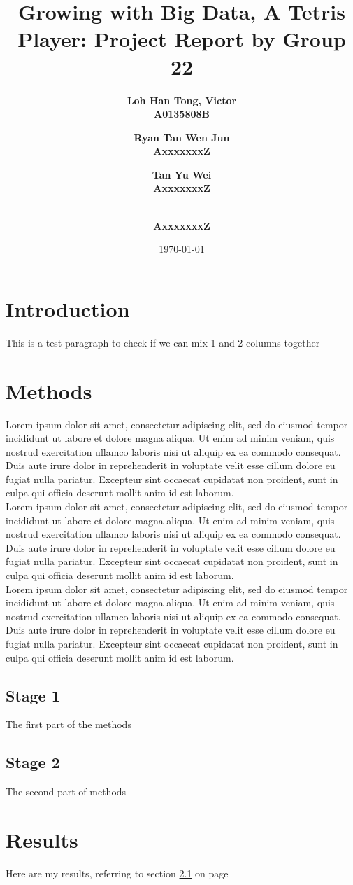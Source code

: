 \documentclass[a4paper,12pt,twocolumn]{article}
\begin{document}
\title{Growing with Big Data, A Tetris Player: Project Report by Group 22}
\author{\bf{Loh Han Tong, Victor} \\ A0135808B
    \and \bf{Ryan Tan Wen Jun} \\ AxxxxxxxZ \and \bf {Tan Yu Wei} \\ AxxxxxxxZ
    \and \bf{} \\ AxxxxxxxZ
}
\date{\today}
\maketitle

\section{Introduction}
This is a test paragraph to check if we can mix 1 and 2 columns together

\section{Methods}
Lorem ipsum dolor sit amet, consectetur adipiscing elit, sed do eiusmod tempor
incididunt ut labore et dolore magna aliqua. Ut enim ad minim veniam, quis nostrud
exercitation ullamco laboris nisi ut aliquip ex ea commodo consequat.
Duis aute irure dolor in reprehenderit in voluptate velit esse cillum dolore eu
fugiat nulla pariatur. Excepteur sint occaecat cupidatat non proident, sunt in
culpa qui officia deserunt mollit anim id est laborum.\\

\noindent
Lorem ipsum dolor sit amet, consectetur adipiscing elit, sed do eiusmod tempor
incididunt ut labore et dolore magna aliqua. Ut enim ad minim veniam, quis nostrud
exercitation ullamco laboris nisi ut aliquip ex ea commodo consequat.
Duis aute irure dolor in reprehenderit in voluptate velit esse cillum dolore eu
fugiat nulla pariatur. Excepteur sint occaecat cupidatat non proident, sunt in
culpa qui officia deserunt mollit anim id est laborum.\\

\noindent
Lorem ipsum dolor sit amet, consectetur adipiscing elit, sed do eiusmod tempor
incididunt ut labore et dolore magna aliqua. Ut enim ad minim veniam, quis nostrud
exercitation ullamco laboris nisi ut aliquip ex ea commodo consequat.
Duis aute irure dolor in reprehenderit in voluptate velit esse cillum dolore eu
fugiat nulla pariatur. Excepteur sint occaecat cupidatat non proident, sunt in
culpa qui officia deserunt mollit anim id est laborum.

\subsection{Stage 1}
\label{section1}
The first part of the methods

\subsection{Stage 2}
The second part of methods

\section{Results}
Here are my results, referring to section
\ref{section1} on page \pageref{section1}
\end{document}

